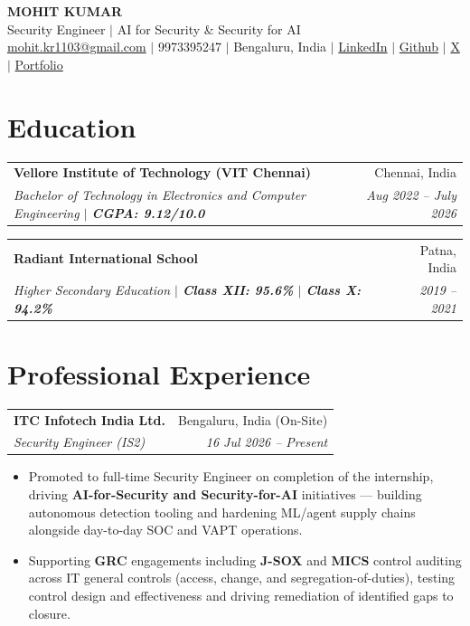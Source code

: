 \documentclass[11pt,a4paper]{article}
\newcommand{\resumeSubheading}[4]{
  \item[]
    \begin{tabularx}{\textwidth}{X r}
      \textbf{#1} & #2 \\
      \textit{#3} & \textit{#4}
    \end{tabularx}
}
\begin{document}
\begin{center}
    {\Huge \textbf{MOHIT KUMAR}} \\
    \vspace{2pt}
    {\large Security Engineer $|$ AI for Security \& Security for AI} \\
    \vspace{3pt}
    \href{mailto:mohit.kr1103@gmail.com}{mohit.kr1103@gmail.com} $|$ 9973395247 $|$ Bengaluru, India $|$ \href{https://www.linkedin.com/in/mohitkumar111}{LinkedIn} $|$ \href{https://github.com/mk12002}{Github} $|$ \href{https://x.com/mohitkr111}{X} $|$ \href{https://mohitkumar-mu.vercel.app/}{Portfolio}
\end{center}

\vspace{-8pt}

\section{Education}
\vspace{-2pt}
\resumeSubheading
{Vellore Institute of Technology (VIT Chennai)}{Chennai, India}
{Bachelor of Technology in Electronics and Computer Engineering $|$ \textbf{CGPA: 9.12/10.0}}{Aug 2022 -- July 2026}

\resumeSubheading
{Radiant International School}{Patna, India}
{Higher Secondary Education $|$ \textbf{Class XII: 95.6\%} $|$ \textbf{Class X: 94.2\%}}{2019 -- 2021}

\vspace{-2pt}

\section{Professional Experience}

\resumeSubheading
{ITC Infotech India Ltd.}{Bengaluru, India (On-Site)}
{Security Engineer (IS2)}{16 Jul 2026 -- Present}
\begin{itemize}
    \item Promoted to full-time Security Engineer on completion of the internship, driving \textbf{AI-for-Security and Security-for-AI} initiatives — building autonomous detection tooling and hardening ML/agent supply chains alongside day-to-day SOC and VAPT operations.
    \item Supporting \textbf{GRC} engagements including \textbf{J-SOX} and \textbf{MICS} control auditing across IT general controls (access, change, and segregation-of-duties), testing control design and effectiveness and driving remediation of identified gaps to closure.
\end{itemize}
\end{document}
